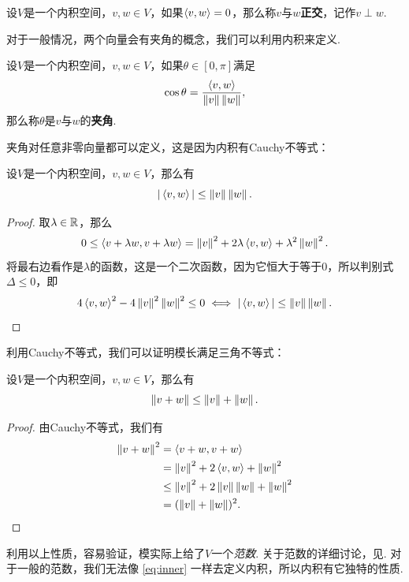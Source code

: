 \begin{definition}[正交]
设$V$是一个内积空间，$v,w\in V$，如果$\left\langle{v},{w}\right\rangle=0$，那么称$v$与$w$\textbf{正交}，记作$v\perp w$.
\end{definition}

对于一般情况，两个向量会有夹角的概念，我们可以利用内积来定义. 

\begin{definition}[夹角]
设$V$是一个内积空间，$v,w\in V$，如果$\theta\in[0,\pi]$满足
\[
    \cos\theta=\frac{\left\langle{v},{w}\right\rangle}{\left\|v\right\|\left\|w\right\|},
\]
那么称$\theta$是$v$与$w$的\textbf{夹角}. 
\end{definition}

夹角对任意非零向量都可以定义，这是因为内积有Cauchy不等式：

\begin{theorem}[Cauchy不等式]\label{theorem:cauchy}
设$V$是一个内积空间，$v,w\in V$，那么有
\[
    |\left\langle{v},{w}\right\rangle|\leq \left\|v\right\|\left\|w\right\|.
\]
\end{theorem}

\begin{proof}
    取$\lambda\in \mathbb{R}$，那么
    \[
        0\leq \left\langle{v+\lambda w},{v+\lambda w}\right\rangle=\left\|v\right\|^2+2\lambda\left\langle{v},{w}\right\rangle+\lambda^2\left\|w\right\|^2.
    \]
将最右边看作是$\lambda$的函数，这是一个二次函数，因为它恒大于等于$0$，所以判别式$\Delta\leq 0$，即
\[
    4\left\langle{v},{w}\right\rangle^2-4\left\|v\right\|^2\left\|w\right\|^2\leq 0\iff |\left\langle{v},{w}\right\rangle|\leq \left\|v\right\|\left\|w\right\|.
\]
\end{proof}

利用Cauchy不等式，我们可以证明模长满足三角不等式：
\begin{theorem}[三角不等式]\label{theorem:triangle}
设$V$是一个内积空间，$v,w\in V$，那么有
\[
    \left\|v+w\right\|\leq \left\|v\right\|+\left\|w\right\|.
\]
\end{theorem}

\begin{proof}
由Cauchy不等式，我们有
\begin{align*}
    \left\|v+w\right\|^2 &= \left\langle{v+w},{v+w}\right\rangle \\
    &= \left\|v\right\|^2+2\left\langle{v},{w}\right\rangle+\left\|w\right\|^2 \\
    &\leq \left\|v\right\|^2+2\left\|v\right\|\left\|w\right\|+\left\|w\right\|^2 \\
    &= (\left\|v\right\|+\left\|w\right\|)^2.
\end{align*}
\end{proof}

利用以上性质，容易验证，模实际上给了$V$一个\textit{范数}. 关于范数的详细讨论，见. 对于一般的范数，我们无法像 \eqref{eq:inner} 一样去定义内积，所以内积有它独特的性质. 


